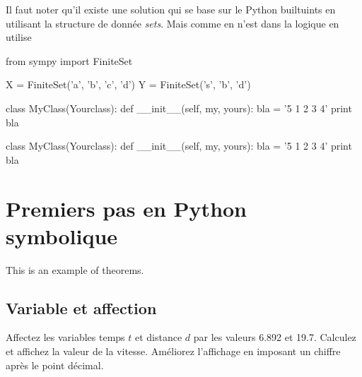 \documentclass[11pt,fleqn]{book} %
\begin{document}

\begin{solution}
Il faut noter qu'il existe une solution qui se base sur le Python builtuints en utilisant la structure de donnée \textit{sets}. Mais comme en n'est dans la logique en utilise 
\begin{python}
from sympy import FiniteSet

X = FiniteSet('a', 'b', 'c', 'd')
Y = FiniteSet('s', 'b', 'd')

class MyClass(Yourclass):
    def __init__(self, my, yours):
        bla = '5 1 2 3 4'
        print bla
\end{python}
\begin{python}
class MyClass(Yourclass):
    def __init__(self, my, yours):
        bla = '5 1 2 3 4'
        print bla
\end{python}

\end{solution}
\section{Premiers pas en Python symbolique}

This is an example of theorems.

\subsection{Variable et affection}

\begin{exercise}
Affectez les variables temps $t$ et distance $d$ par les valeurs 6.892 et 19.7. Calculez et affichez la valeur de la vitesse. Améliorez l’affichage en imposant un chiffre après le point décimal.
\end{exercise}
\end{document}
